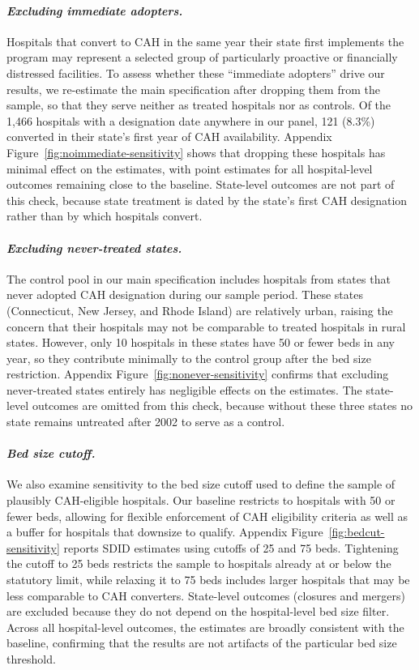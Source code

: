 \documentclass[a4paper, 12pt]{article}
\begin{document}
\paragraph{\textit{Excluding immediate adopters.}}
Hospitals that convert to CAH in the same year their state first implements the program may represent a selected group of particularly proactive or financially distressed facilities. To assess whether these ``immediate adopters'' drive our results, we re-estimate the main specification after dropping them from the sample, so that they serve neither as treated hospitals nor as controls. Of the 1,466 hospitals with a designation date anywhere in our panel, 121 (8.3\%) converted in their state's first year of CAH availability. Appendix Figure~\ref{fig:noimmediate-sensitivity} shows that dropping these hospitals has minimal effect on the estimates, with point estimates for all hospital-level outcomes remaining close to the baseline. State-level outcomes are not part of this check, because state treatment is dated by the state's first CAH designation rather than by which hospitals convert.

\paragraph{\textit{Excluding never-treated states.}}
The control pool in our main specification includes hospitals from states that never adopted CAH designation during our sample period. These states (Connecticut, New Jersey, and Rhode Island) are relatively urban, raising the concern that their hospitals may not be comparable to treated hospitals in rural states. However, only 10 hospitals in these states have 50 or fewer beds in any year, so they contribute minimally to the control group after the bed size restriction. Appendix Figure~\ref{fig:nonever-sensitivity} confirms that excluding never-treated states entirely has negligible effects on the estimates. The state-level outcomes are omitted from this check, because without these three states no state remains untreated after 2002 to serve as a control.

\paragraph{\textit{Bed size cutoff.}}
We also examine sensitivity to the bed size cutoff used to define the sample of plausibly CAH-eligible hospitals. Our baseline restricts to hospitals with 50 or fewer beds, allowing for flexible enforcement of CAH eligibility criteria as well as a buffer for hospitals that downsize to qualify. Appendix Figure~\ref{fig:bedcut-sensitivity} reports SDID estimates using cutoffs of 25 and 75 beds. Tightening the cutoff to 25 beds restricts the sample to hospitals already at or below the statutory limit, while relaxing it to 75 beds includes larger hospitals that may be less comparable to CAH converters. State-level outcomes (closures and mergers) are excluded because they do not depend on the hospital-level bed size filter. Across all hospital-level outcomes, the estimates are broadly consistent with the baseline, confirming that the results are not artifacts of the particular bed size threshold.
\end{document}

